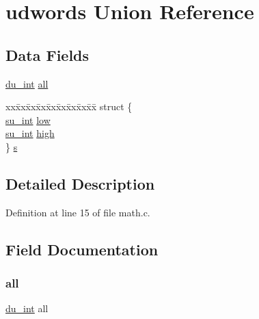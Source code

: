 \hypertarget{unionudwords}{}\section{udwords Union Reference}
\label{unionudwords}
\subsection*{Data Fields}
\begin{DoxyCompactItemize}
\item 
\hyperlink{math_8c_a86c9c257fc96e5d8128ef845e11693f8}{du\+\_\+int} \hyperlink{unionudwords_aa22770fbb4b2f35a327c668f2b9cfafb}{all}
\item 
\begin{tabbing}
xx\=xx\=xx\=xx\=xx\=xx\=xx\=xx\=xx\=\kill
struct \{\\
\>\hyperlink{math_8c_ac80f361c8037aadb06208683492f5753}{su\_int} \hyperlink{unionudwords_aa8808d04ef26a57c2797d761b736379d}{low}\\
\>\hyperlink{math_8c_ac80f361c8037aadb06208683492f5753}{su\_int} \hyperlink{unionudwords_ab71d57a34d32cc4a0250444dbe4364b0}{high}\\
\} \hyperlink{unionudwords_a007f8c39ee901bb8633f231faeb6c219}{s}\\

\end{tabbing}\end{DoxyCompactItemize}


\subsection{Detailed Description}


Definition at line 15 of file math.\+c.



\subsection{Field Documentation}
\mbox{\label{unionudwords_aa22770fbb4b2f35a327c668f2b9cfafb}} 
\subsubsection{\texorpdfstring{all}{all}}
{\footnotesize\ttfamily \hyperlink{math_8c_a86c9c257fc96e5d8128ef845e11693f8}{du\+\_\+int} all}



